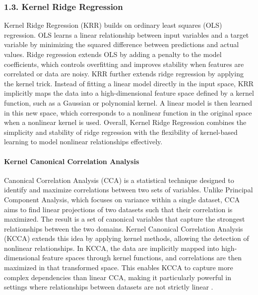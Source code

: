 \subsubsection{1.3. Kernel Ridge Regression}
Kernel Ridge Regression (KRR) builds on ordinary least squares (OLS) regression. OLS learns a linear relationship between input variables and a target variable by minimizing the squared difference between predictions and actual values. Ridge regression extends OLS by adding a penalty to the model coefficients, which controls overfitting and improves stability when features are correlated or data are noisy.
KRR further extends ridge regression by applying the kernel trick. Instead of fitting a linear model directly in the input space, KRR implicitly maps the data into a high-dimensional feature space defined by a kernel function, such as a Gaussian or polynomial kernel. A linear model is then learned in this new space, which corresponds to a nonlinear function in the original space when a nonlinear kernel is used.
Overall, Kernel Ridge Regression combines the simplicity and stability of ridge regression with the flexibility of kernel-based learning to model nonlinear relationships effectively.


\paragraph{Kernel Canonical Correlation Analysis}
\label{sec:background_ml_kcca}

Canonical Correlation Analysis (CCA) is a statistical technique designed to identify and maximize correlations between two sets of variables. Unlike Principal Component Analysis, which focuses on variance within a single dataset, CCA aims to find linear projections of two datasets such that their correlation is maximized. The result is a set of canonical variables that capture the strongest relationships between the two domains. Kernel Canonical Correlation Analysis (KCCA) extends this idea by applying kernel methods, allowing the detection of nonlinear relationships. In KCCA, the data are implicitly mapped into high-dimensional feature spaces through kernel functions, and correlations are then maximized in that transformed space. This enables KCCA to capture more complex dependencies than linear CCA, making it particularly powerful in settings where relationships between datasets are not strictly linear \cite{1202783} \cite{5644899}.


